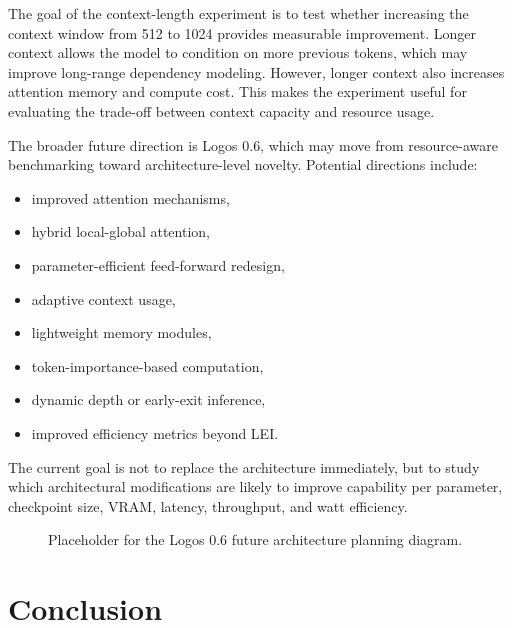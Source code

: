 \documentclass[conference]{IEEEtran}
\begin{document}
The goal of the context-length experiment is to test whether increasing the context window from 512 to 1024 provides measurable improvement. Longer context allows the model to condition on more previous tokens, which may improve long-range dependency modeling. However, longer context also increases attention memory and compute cost. This makes the experiment useful for evaluating the trade-off between context capacity and resource usage.

The broader future direction is Logos 0.6, which may move from resource-aware benchmarking toward architecture-level novelty. Potential directions include:

\begin{itemize}
    \item improved attention mechanisms,
    \item hybrid local-global attention,
    \item parameter-efficient feed-forward redesign,
    \item adaptive context usage,
    \item lightweight memory modules,
    \item token-importance-based computation,
    \item dynamic depth or early-exit inference,
    \item improved efficiency metrics beyond LEI.
\end{itemize}

The current goal is not to replace the architecture immediately, but to study which architectural modifications are likely to improve capability per parameter, checkpoint size, VRAM, latency, throughput, and watt efficiency.

\begin{figure}[H]
    \centering
    \caption{Placeholder for the Logos 0.6 future architecture planning diagram.}
    \label{fig:future_architecture}
\end{figure}

\section{Conclusion}
\end{document}
